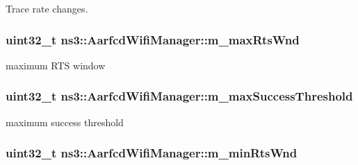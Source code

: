 Trace rate changes. 

\subsubsection[{\texorpdfstring{m\+\_\+max\+Rts\+Wnd}{m_maxRtsWnd}}]{\setlength{\rightskip}{0pt plus 5cm}uint32\+\_\+t ns3\+::\+Aarfcd\+Wifi\+Manager\+::m\+\_\+max\+Rts\+Wnd\hspace{0.3cm}{\ttfamily [private]}}\hypertarget{classns3_1_1AarfcdWifiManager_a6979a9d7c70e9bb5f4e00655072c505d}{}\label{classns3_1_1AarfcdWifiManager_a6979a9d7c70e9bb5f4e00655072c505d}


maximum R\+TS window 

\subsubsection[{\texorpdfstring{m\+\_\+max\+Success\+Threshold}{m_maxSuccessThreshold}}]{\setlength{\rightskip}{0pt plus 5cm}uint32\+\_\+t ns3\+::\+Aarfcd\+Wifi\+Manager\+::m\+\_\+max\+Success\+Threshold\hspace{0.3cm}{\ttfamily [private]}}\hypertarget{classns3_1_1AarfcdWifiManager_a2356178ccd0f0666b94437e1adb33064}{}\label{classns3_1_1AarfcdWifiManager_a2356178ccd0f0666b94437e1adb33064}


maximum success threshold 

\subsubsection[{\texorpdfstring{m\+\_\+min\+Rts\+Wnd}{m_minRtsWnd}}]{\setlength{\rightskip}{0pt plus 5cm}uint32\+\_\+t ns3\+::\+Aarfcd\+Wifi\+Manager\+::m\+\_\+min\+Rts\+Wnd\hspace{0.3cm}{\ttfamily [private]}}\hypertarget{classns3_1_1AarfcdWifiManager_a5bd5aba48bf7267222ac3592a96a642a}{}\label{classns3_1_1AarfcdWifiManager_a5bd5aba48bf7267222ac3592a96a642a}


